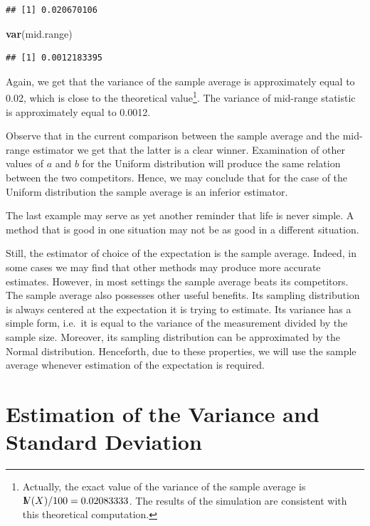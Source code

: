 \documentclass[]{krantz}
\makeatletter
\newenvironment{Shaded}{\begin{snugshade}}{\end{snugshade}}
\newcommand{\KeywordTok}[1]{\textcolor[rgb]{0.13,0.29,0.53}{\textbf{#1}}}
\newcommand{\NormalTok}[1]{#1}
\newcommand{\Var}{{\rm I\kern-.3em V}}
\newenvironment{kframe}{%
\medskip{}
\setlength{\fboxsep}{.8em}
 \def\at@end@of@kframe{}%
 \ifinner\ifhmode%
  \def\at@end@of@kframe{\end{minipage}}%
  \begin{minipage}{\columnwidth}%
 \fi\fi%
 \def\FrameCommand##1{\hskip\@totalleftmargin \hskip-\fboxsep
 \colorbox{shadecolor}{##1}\hskip-\fboxsep
     \hskip-\linewidth \hskip-\@totalleftmargin \hskip\columnwidth}%
 \MakeFramed {\advance\hsize-\width
   \@totalleftmargin\z@ \linewidth\hsize
   \@setminipage}}%
 {\par\unskip\endMakeFramed%
 \at@end@of@kframe}
\renewenvironment{Shaded}{\begin{kframe}}{\end{kframe}}
\theoremstyle{definition}
\theoremstyle{definition}
\theoremstyle{definition}
\theoremstyle{remark}
\makeatother
\begin{document}
\begin{verbatim}
## [1] 0.020670106
\end{verbatim}

\begin{Shaded}
\begin{Highlighting}[]
\KeywordTok{var}\NormalTok{(mid.range)}
\end{Highlighting}
\end{Shaded}

\begin{verbatim}
## [1] 0.0012183395
\end{verbatim}

Again, we get that the variance of the sample average is approximately
equal to 0.02, which is close to the theoretical value\footnote{Actually,
  the exact value of the variance of the sample average is
  \(\Var(X)/100 = 0.02083333\). The results of the simulation are
  consistent with this theoretical computation.}. The variance of
mid-range statistic is approximately equal to 0.0012.

Observe that in the current comparison between the sample average and
the mid-range estimator we get that the latter is a clear winner.
Examination of other values of \(a\) and \(b\) for the Uniform
distribution will produce the same relation between the two competitors.
Hence, we may conclude that for the case of the Uniform distribution the
sample average is an inferior estimator.

The last example may serve as yet another reminder that life is never
simple. A method that is good in one situation may not be as good in a
different situation.

Still, the estimator of choice of the expectation is the sample average.
Indeed, in some cases we may find that other methods may produce more
accurate estimates. However, in most settings the sample average beats
its competitors. The sample average also possesses other useful
benefits. Its sampling distribution is always centered at the
expectation it is trying to estimate. Its variance has a simple form,
i.e.~it is equal to the variance of the measurement divided by the
sample size. Moreover, its sampling distribution can be approximated by
the Normal distribution. Henceforth, due to these properties, we will
use the sample average whenever estimation of the expectation is
required.

\section{Estimation of the Variance and Standard
Deviation}\label{estimation-of-the-variance-and-standard-deviation}
\end{document}
